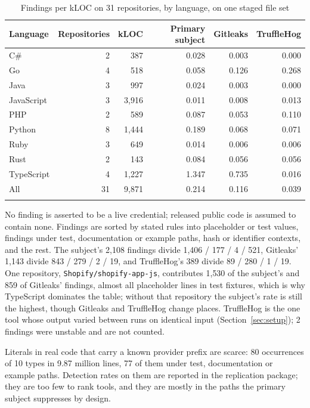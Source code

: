 \documentclass[pdflatex,sn-basic]{sn-jnl}
\begin{document}
\begin{table}[t]
\centering
\caption{Findings per kLOC on 31 repositories, by language, on one staged file set}
\label{tab:fplang}
\small
\setlength{\tabcolsep}{3pt}
\begin{tabular}{@{}lrrrrr@{}}
\toprule
Language & Repositories & kLOC & Primary subject & Gitleaks & TruffleHog \\
\midrule
C\# & 2 & 387 & 0.028 & 0.003 & 0.000 \\
Go & 4 & 518 & 0.058 & 0.126 & 0.268 \\
Java & 3 & 997 & 0.024 & 0.003 & 0.000 \\
JavaScript & 3 & 3{,}916 & 0.011 & 0.008 & 0.013 \\
PHP & 2 & 589 & 0.087 & 0.053 & 0.110 \\
Python & 8 & 1{,}444 & 0.189 & 0.068 & 0.071 \\
Ruby & 3 & 649 & 0.014 & 0.006 & 0.006 \\
Rust & 2 & 143 & 0.084 & 0.056 & 0.056 \\
TypeScript & 4 & 1{,}227 & 1.347 & 0.735 & 0.016 \\
\midrule
All & 31 & 9{,}871 & 0.214 & 0.116 & 0.039 \\
\botrule
\end{tabular}
\end{table}

No finding is asserted to be a live credential; released public code is assumed to contain none. Findings are sorted by stated rules into placeholder or test values, findings under test, documentation or example paths, hash or identifier contexts, and the rest. The subject's 2{,}108 findings divide 1{,}406 / 177 / 4 / 521, Gitleaks' 1{,}143 divide 843 / 279 / 2 / 19, and TruffleHog's 389 divide 89 / 280 / 1 / 19. One repository, \texttt{Shopify/shopify-app-js}, contributes 1{,}530 of the subject's and 859 of Gitleaks' findings, almost all placeholder lines in test fixtures, which is why TypeScript dominates the table; without that repository the subject's rate is still the highest, though Gitleaks and TruffleHog change places. TruffleHog is the one tool whose output varied between runs on identical input (Section~\ref{sec:setup}); 2 findings were unstable and are not counted.

Literals in real code that carry a known provider prefix are scarce: 80 occurrences of 10 types in 9.87 million lines, 77 of them under test, documentation or example paths. Detection rates on them are reported in the replication package; they are too few to rank tools, and they are mostly in the paths the primary subject suppresses by design.
\end{document}
